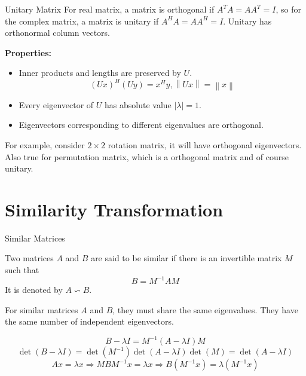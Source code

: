 \documentclass{beamer}
\begin{document}
\begin{frame}{Unitary Matrix}
For real matrix, a matrix is orthogonal if $A^TA=AA^T=I$, so for the complex matrix, a matrix is unitary if $A^HA=AA^H=I$. Unitary has orthonormal column vectors.

\vspace{5pt}
\textbf{Properties:}
\begin{itemize}
    \item Inner products and lengths are preserved by $U$.
    \begin{equation*}
        \left( Ux \right) ^H\left( Uy \right) =x^Hy, \left\| Ux \right\| =\left\| x \right\|
    \end{equation*}
    \item Every eigenvector of $U$ has absolute value $|\lambda| = 1$.
    \item Eigenvectors corresponding to different eigenvalues are orthogonal.
\end{itemize}

\vspace{3pt}
For example, consider $2\times 2$ rotation matrix, it will have orthogonal eigenvectors. Also true for permutation matrix, which is a orthogonal matrix and of course unitary.

\end{frame}

\section{Similarity Transformation}
\begin{frame}{Similar Matrices}
\begin{definition}
    Two matrices $A$ and $B$ are said to be similar if there is an invertible matrix $M$ such that
    \begin{equation*}
        B=M^{-1}AM
    \end{equation*}
    It is denoted by $A\backsim B$.
\end{definition}

For similar matrices $A$ and $B$, they must share the same eigenvalues. They have the same number of independent eigenvectors.

\begin{equation*}
    B-\lambda I=M^{-1}\left( A-\lambda I \right) M
\end{equation*}
\begin{equation*}
    \det \left( B-\lambda I \right) =\det \left( M^{-1} \right) \det \left( A-\lambda I \right) \det \left( M \right) =\det \left( A-\lambda I \right)
\end{equation*}
\begin{equation*}
    Ax=\lambda x\Rightarrow MBM^{-1}x=\lambda x\Rightarrow B\left( M^{-1}x \right) =\lambda \left( M^{-1}x \right)
\end{equation*}

\end{frame}
\end{document}
